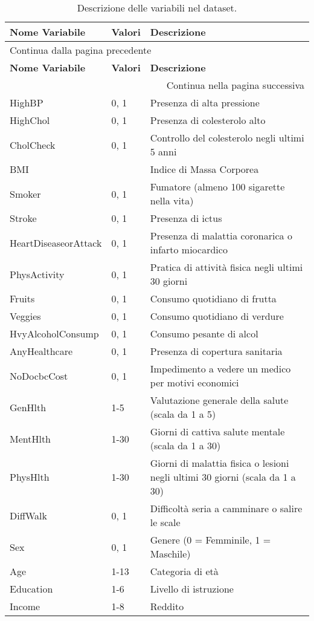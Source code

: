 \begin{longtable}{lp{2cm}p{8cm}}
  \toprule
  \textbf{Nome Variabile} & \textbf{Valori} & \textbf{Descrizione} \\
  \midrule
  \endfirsthead
  \multicolumn{3}{l}{{Continua dalla pagina precedente}} \\
  \toprule
  \textbf{Nome Variabile} & \textbf{Valori} & \textbf{Descrizione} \\
  \midrule
  \endhead
  \bottomrule
  \multicolumn{3}{r}{{Continua nella pagina successiva}} \\
  \endfoot
  \bottomrule
  \caption{Descrizione delle variabili nel dataset.}
  \endlastfoot
  HighBP & 0, 1 & Presenza di alta pressione \\
  HighChol & 0, 1 & Presenza di colesterolo alto \\
  CholCheck & 0, 1 & Controllo del colesterolo negli ultimi 5 anni \\
  BMI & & Indice di Massa Corporea \\
  Smoker & 0, 1 & Fumatore (almeno 100 sigarette nella vita) \\
  Stroke & 0, 1 & Presenza di ictus \\
  HeartDiseaseorAttack & 0, 1 & Presenza di malattia coronarica o infarto miocardico \\
  PhysActivity & 0, 1 & Pratica di attività fisica negli ultimi 30 giorni \\
  Fruits & 0, 1 & Consumo quotidiano di frutta \\
  Veggies & 0, 1 & Consumo quotidiano di verdure \\
  HvyAlcoholConsump & 0, 1 & Consumo pesante di alcol \\
  AnyHealthcare & 0, 1 & Presenza di copertura sanitaria \\
  NoDocbcCost & 0, 1 & Impedimento a vedere un medico per motivi economici \\
  GenHlth & 1-5 & Valutazione generale della salute (scala da 1 a 5) \\
  MentHlth & 1-30 & Giorni di cattiva salute mentale (scala da 1 a 30) \\
  PhysHlth & 1-30 & Giorni di malattia fisica o lesioni negli ultimi 30 giorni (scala da 1 a 30) \\
  DiffWalk & 0, 1 & Difficoltà seria a camminare o salire le scale \\
  Sex & 0, 1 & Genere (0 = Femminile, 1 = Maschile) \\
  Age & 1-13 & Categoria di età \\
  Education & 1-6 & Livello di istruzione \\
  Income & 1-8 & Reddito \\
\end{longtable}